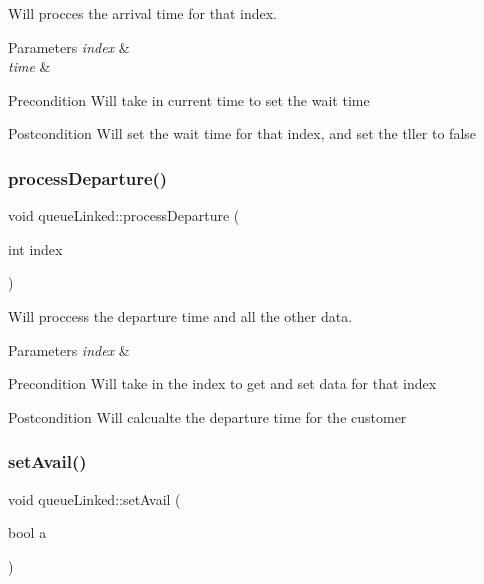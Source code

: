 Will procces the arrival time for that index. 


\begin{DoxyParams}{Parameters}
{\em index} & \\
\hline
{\em time} & \\
\hline
\end{DoxyParams}
\begin{DoxyPrecond}{Precondition}
Will take in current time to set the wait time 
\end{DoxyPrecond}
\begin{DoxyPostcond}{Postcondition}
Will set the wait time for that index, and set the tller to false 
\end{DoxyPostcond}
\mbox{\label{classqueue_linked_a7d50b634bcfef6b6128799e4b80275e5}} 
\subsubsection{\texorpdfstring{process\+Departure()}{processDeparture()}}
{\footnotesize\ttfamily void queue\+Linked\+::process\+Departure (\begin{DoxyParamCaption}\item[{int}]{index }\end{DoxyParamCaption})}



Will proccess the departure time and all the other data. 


\begin{DoxyParams}{Parameters}
{\em index} & \\
\hline
\end{DoxyParams}
\begin{DoxyPrecond}{Precondition}
Will take in the index to get and set data for that index 
\end{DoxyPrecond}
\begin{DoxyPostcond}{Postcondition}
Will calcualte the departure time for the customer 
\end{DoxyPostcond}
\mbox{\label{classqueue_linked_a26a7a4d03d8a4946b980d1d130799704}} 
\subsubsection{\texorpdfstring{set\+Avail()}{setAvail()}}
{\footnotesize\ttfamily void queue\+Linked\+::set\+Avail (\begin{DoxyParamCaption}\item[{bool}]{a }\end{DoxyParamCaption})}




